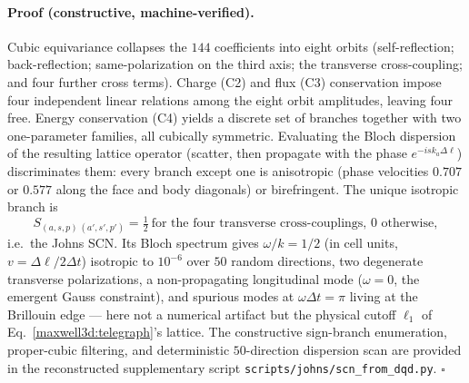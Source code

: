 \documentclass[11pt,a4paper]{article}
\theoremstyle{plain}
\theoremstyle{remark}
\begin{document}
\paragraph{Proof (constructive, machine-verified).} Cubic equivariance collapses the $144$ coefficients into eight orbits (self-reflection; back-reflection; same-polarization on the third axis; the transverse cross-coupling; and four further cross terms). Charge (C2) and flux (C3) conservation impose four independent linear relations among the eight orbit amplitudes, leaving four free. Energy conservation (C4) yields a discrete set of branches together with two one-parameter families, all cubically symmetric. Evaluating the Bloch dispersion of the resulting lattice operator (scatter, then propagate with the phase $e^{-i s k_a \Delta\ell}$) discriminates them: every branch except one is anisotropic (phase velocities $0.707$ or $0.577$ along the face and body diagonals) or birefringent. The unique isotropic branch is
\begin{equation}\label{maxwell3d:scn}
S_{(a,s,p)\,(a',s',p')} = \tfrac12\ \text{for the four transverse cross-couplings, } 0 \text{ otherwise},
\end{equation}
i.e.\ the Johns SCN. Its Bloch spectrum gives $\omega/k = 1/2$ (in cell units, $v=\Delta\ell/2\Delta t$) isotropic to $10^{-6}$ over $50$ random directions, two degenerate transverse polarizations, a non-propagating longitudinal mode ($\omega=0$, the emergent Gauss constraint), and spurious modes at $\omega\Delta t = \pi$ living at the Brillouin edge --- here not a numerical artifact but the physical cutoff $\ell_1$ of Eq.~\eqref{maxwell3d:telegraph}'s lattice. The constructive sign-branch enumeration, proper-cubic filtering, and deterministic $50$-direction dispersion scan are provided in the reconstructed supplementary script \texttt{scripts/johns/scn\_from\_dqd.py}. $\square$
\end{document}
